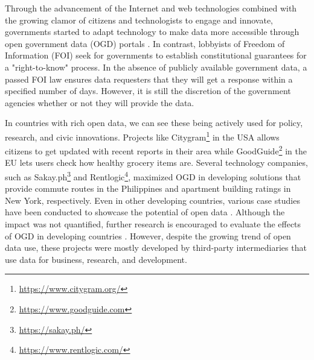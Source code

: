 \documentclass{sigchi}
\begin{document}
Through the advancement of the Internet and web technologies combined with the growing clamor of citizens and technologists to engage and innovate, governments started to adapt technology to make data more accessible through open government data (OGD) portals \cite{DAWES201615, YuRobinson2012}. In contrast, lobbyists of Freedom of Information (FOI) seek for governments to establish constitutional guarantees for a "right-to-know" process. In the absence of publicly available government data, a passed FOI law ensures data requesters that they will get a response within a specified number of days. However, it is still the discretion of the government agencies whether or not they will provide the data. 

In countries with rich open data, we can see these being actively used for policy, research, and civic innovations. Projects like Citygram\footnote{\url{https://www.citygram.org/}} in the USA allows citizens to get updated with recent reports in their area while GoodGuide\footnote{\url{https://www.goodguide.com}} in the EU lets users check how healthy grocery items are. Several technology companies, such as Sakay.ph\footnote{\url{https://sakay.ph/}} and Rentlogic\footnote{\url{https://www.rentlogic.com/}}, maximized OGD in developing solutions that provide commute routes in the Philippines and apartment building ratings in New York, respectively. Even in other developing countries, various case studies have been conducted to showcase the potential of open data \cite{farahi2018}. Although the impact was not quantified, further research is encouraged to evaluate the effects of OGD in developing countries \cite{farahi2018}. However, despite the growing trend of open data use, these projects were mostly developed by third-party intermediaries that use data for business, research, and development. 
\end{document}
